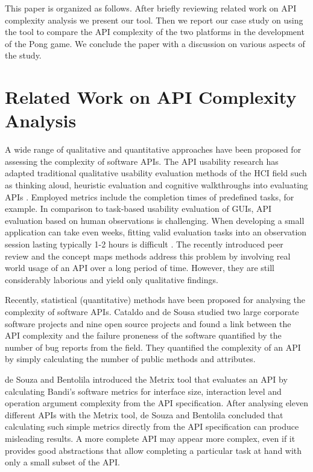 \documentclass[conference]{IEEEtran}
\begin{document}
This paper is organized as follows. After briefly reviewing related
work on API complexity analysis we present our tool. Then we report
our case study on using the tool to compare the API complexity of the
two platforms in the development of the Pong game. We conclude the
paper with a discussion on various aspects of the study.


\section{Related Work on API Complexity Analysis%
  \label{related-work-on-api-complexity-analysis}%
}

A wide range of qualitative and quantitative approaches have been
proposed for assessing the complexity of software APIs. The API
usability research has adapted traditional qualitative usability
evaluation methods of the HCI field such as thinking aloud, heuristic
evaluation and cognitive walkthroughs into evaluating APIs
\cite{overview}. Employed metrics include the completion times of
predefined tasks, for example. In comparison to task-based usability
evaluation of GUIs, API evaluation based on human observations is
challenging. When developing a small application can take even weeks,
fitting valid evaluation tasks into an observation session lasting
typically 1-2 hours is difficult \cite{conceptmaps}. The recently
introduced peer review \cite{apipeerreview} and the concept maps
\cite{conceptmaps} methods address this problem by involving real world
usage of an API over a long period of time. However, they are still
considerably laborious and yield only qualitative findings.

Recently, statistical (quantitative) methods have been proposed for
analysing the complexity of software APIs. Cataldo and de Sousa
\cite{cmu-api_failures} studied two large corporate software projects and
nine open source projects and found a link between the API complexity
and the failure proneness of the software quantified by the number of
bug reports from the field. They quantified the complexity of an API
by simply calculating the number of public methods and
attributes.

de Souza and Bentolila \cite{automatic-api-eval} introduced the Metrix tool
that evaluates an API by calculating Bandi’s software metrics for
interface size, interaction level and operation argument complexity
from the API specification. After analysing eleven different APIs with
the Metrix tool, de Souza and Bentolila concluded that calculating
such simple metrics directly from the API specification can produce
misleading results. A more complete API may appear more complex, even
if it provides good abstractions that allow completing a particular
task at hand with only a small subset of the API.
\end{document}
